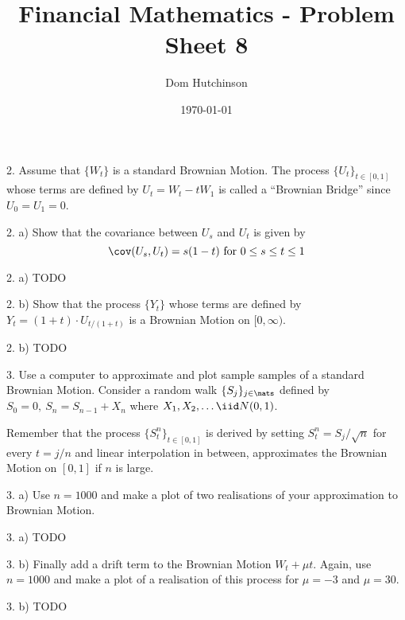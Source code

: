 \documentclass[11pt,a4paper]{article}
\begin{document}
\questionsfalse

\title{Financial Mathematics - Problem Sheet 8}
\author{Dom Hutchinson}
\date{\today}
\maketitle

\begin{question}{2.}
  Assume that $\{W_t\}$ is a standard Brownian Motion. The process $\{U_t\}_{t\in[0,1]}$ whose terms are defined by $U_t=W_t-tW_1$ is called a ``Brownian Bridge'' since $U_0=U_1=0$.
\end{question}

\begin{question}{2. a)}
  Show that the covariance between $U_s$ and $U_t$ is given by
  \[ \cov(U_s,U_t)=s(1-t)\text{ for }0\leq s\leq t\leq1 \]
\end{question}

\begin{answer}{2. a)}
  TODO
\end{answer}

\begin{question}{2. b)}
  Show that the process $\{Y_t\}$ whose terms are defined by $Y_t=(1+t)\cdot U_{t/(1+t)}$ is a Brownian Motion on $[0,\infty)$.
\end{question}

\begin{answer}{2. b)}
  TODO
\end{answer}

\begin{question}{3.}
  Use a computer to approximate and plot sample samples of a standard Brownian Motion. Consider a random walk $\{S_j\}_{j\in\nats}$ defined by $S_0=0,\ S_n=S_{n-1}+X_n$ where $X_1,X_2,\dots\iid N(0,1)$.
  \par Remember that the process $\{S_t^n\}_{t\in[0,1]}$ is derived by setting $S_t^n=S_j/\sqrt{n}$ for every $t=j/n$ and linear interpolation in between, approximates the Brownian Motion on $[0,1]$ if $n$ is large.
\end{question}

\begin{question}{3. a)}
  Use $n=1000$ and make a plot of two realisations of your approximation to Brownian Motion.
\end{question}

\begin{answer}{3. a)}
  TODO
\end{answer}

\begin{question}{3. b)}
  Finally add a drift term to the Brownian Motion $W_t+\mu t$. Again, use $n=1000$ and make a plot of a realisation of this process for $\mu=-3$ and $\mu=30$.
\end{question}

\begin{answer}{3. b)}
  TODO
\end{answer}
\end{document}
